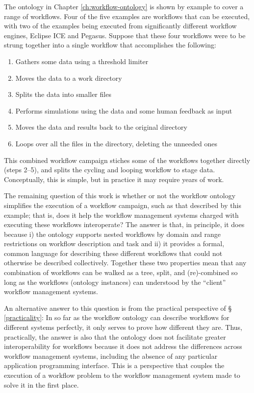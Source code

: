 The ontology in Chapter \ref{ch:workflow-ontology} is shown by example to cover
a range of workflows. Four of the five examples are workflows that can be
executed, with two of the examples being executed from significantly different
workflow engines, Eclipse ICE and Pegasus. Suppose that these four workflows
were to be strung together into a single workflow that accomplishes the
following:
\begin{enumerate}
  \item Gathers some data using a threshold limiter
  \item Moves the data to a work directory
  \item Splits the data into smaller files
  \item Performs simulations using the data and some human feedback as input
  \item Moves the data and results back to the original directory
  \item Loops over all the files in the directory, deleting the unneeded ones
\end{enumerate}
This combined workflow campaign stiches some of the workflows together directly
(steps 2--5), and splits the cycling and looping workflow to stage data.
Conceptually, this is simple, but in practice it may require years of work.

The remaining question of this work is whether or not the workflow ontology
simplifies the execution of a workflow campaign, such as that described by
this example; that is, does it help the workflow management systems charged with
executing these workflows interoperate? The answer is that, in principle, it
does because i) the ontology supports nested workflows by domain and range
restrictions on workflow description and task and ii) it provides a formal,
common language for describing these different workflows that could not
otherwise be described collectively. Together these two properties mean that
any combination of workflows can be walked as a tree, split, and (re)-combined
so long as the workflows (ontology instances) can understood by the ``client''
workflow management systems.

An alternative answer to this question is from the practical perspective of \S
\ref{practicality}: In so far as the workflow ontology can describe workflows
for different systems perfectly, it only serves to prove how different they are.
Thus, practically, the answer is also that the ontology does not facilitate
greater interoperability for workflows because it does not address the
differences across workflow management systems, including the absence of any
particular application programming interface. This is a perspective that couples
the execution of a workflow problem to the workflow management system made to
solve it in the first place.

